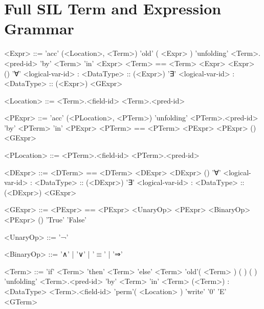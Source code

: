 
\section{Full SIL Term and Expression Grammar}\label{apdx:grammar}
\begin{grammar}
<Expr> ::= 'acc' (<Location>, <Term>)
	\alt 'old' ( <Expr> )
	\alt 'unfolding' <Term>.<pred-id> 'by' <Term> 'in' <Expr>
	\alt <Term> == <Term>
	\alt <unary-op> <Expr>
	\alt <binary-op> <Expr>
	\alt <dom-pred-id>()
	\alt '∀' <logical-var-id> : <DataType> :: (<Expr>)
	\alt '∃' <logical-var-id> : <DataType> :: (<Expr>)
	\alt <GExpr>

<Location> ::= <Term>.<field-id>
	\alt <Term>.<pred-id>
\end{grammar}

\begin{grammar}
<PExpr> ::= 'acc' (<PLocation>, <PTerm>)
	\alt 'unfolding' <PTerm>.<pred-id> 'by' <PTerm> 'in' <PExpr>
	\alt <PTerm> == <PTerm>
	\alt <unary-op> <PExpr>
	\alt <binary-op> <PExpr>
	\alt <dom-pred-id>()
	\alt <GExpr>

<PLocation> ::= <PTerm>.<field-id>
	\alt <PTerm>.<pred-id>
\end{grammar}

\begin{grammar}
<DExpr> ::= <DTerm> == <DTerm>
	\alt <unary-op> <DExpr>
	\alt <binary-op> <DExpr>
	\alt <dom-pred-id>()
	\alt '∀' <logical-var-id> : <DataType> :: (<DExpr>)
	\alt '∃' <logical-var-id> : <DataType> :: (<DExpr>)
	\alt <GExpr>
\end{grammar}

\begin{grammar}
<GExpr> ::= <PExpr> == <PExpr>
	\alt <UnaryOp> <PExpr>
	\alt <BinaryOp> <PExpr>
	\alt <dom-pred-id>()
	\alt 'True'
	\alt 'False'
\end{grammar}

\begin{grammar}
<UnaryOp> ::= '¬'

<BinaryOp> ::= '∧' | '∨' | '$\equiv$' | '⇒'
\end{grammar}
\clearpage
\begin{grammar}
<Term> ::= 'if' <Term> 'then' <Term> 'else' <Term>
	\alt 'old'( <Term> )
	\alt <func-id>(  )
	\alt <dom-func-id>(  )
	\alt 'unfolding' <Term>.<pred-id> 'by' <Term> 'in' <Term>
	\alt (<Term>) : <DataType>
	\alt <Term>.<field-id>
	\alt 'perm'( <Location> )
	\alt 'write'
	\alt '0'
	\alt  'E'
	\alt <GTerm>
\end{grammar}


